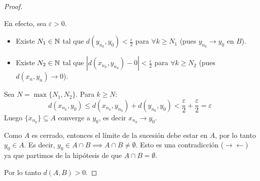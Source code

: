 \begin{proof}
    \begin{prueba}
    En efecto, sea $\varepsilon > 0$. 
    \begin{itemize}
        \item Existe $N_1 \in \mathbb{N}$ tal que $d(y_{n_k}, y_0) < \frac{\varepsilon}{2}$ para $\forall k \ge N_1$ (pues $y_{n_k} \rightarrow y_0$ en $B$).
        \item Existe $N_2 \in \mathbb{N}$ tal que $|d(x_{n_k}, y_{n_k}) - 0| < \frac{\varepsilon}{2}$ para $\forall k \ge N_2$ (pues $d(x_n, y_n) \rightarrow 0$).
    \end{itemize}
    Sea $N = \max\{N_1, N_2\}$. Para $k \ge N$:
    \[d(x_{n_k}, y_0) \le d(x_{n_k}, y_{n_k}) + d(y_{n_k}, y_0) < \frac{\varepsilon}{2} + \frac{\varepsilon}{2} = \varepsilon\]
    Luego $\{x_{n_k}\} \subseteq A$ converge a $y_0$, es decir $x_{n_k} \rightarrow y_0$.
    \end{prueba}
    
    Como $A$ es cerrado, entonces el límite de la sucesión debe estar en $A$, por lo tanto $y_0 \in A$.
    Es decir, $y_0 \in A \cap B \implies A \cap B \ne \emptyset$. Esto es una contradicción ($\rightarrow\leftarrow$) ya que partimos de la hipótesis de que $A \cap B = \emptyset$. 
    
    Por lo tanto $d(A, B) > 0$.
\end{proof}
